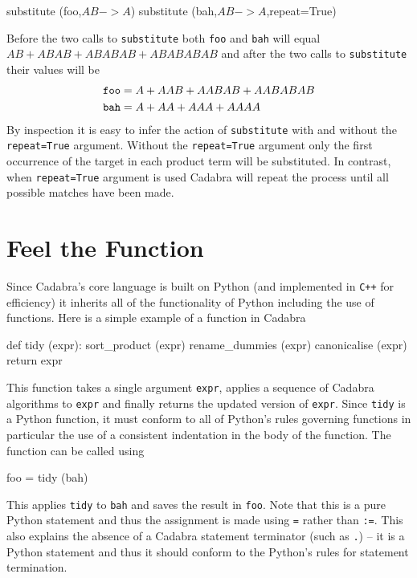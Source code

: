 \documentclass[a4paper,12pt]{article}
\numberwithin{equation}{section}%
\begin{document}
\begin{Exercises}
\begin{Exercise}
\begin{cadabra}
         substitute (foo,$A B -> A$)
         substitute (bah,$A B -> A$,repeat=True)
      \end{cadabra}
      Before the two calls to \verb|substitute| both \verb|foo| and \verb|bah| will equal
      $A B + A B A B + A B A B A B + A B A B A B A B$ and after the two calls to
      \verb|substitute| their values will be
      \begin{align*}
         {\tt foo} &= A + A A B + A A B A B + A A B A B A B\\
         {\tt bah} &= A + A A + A A A + A A A A
      \end{align*}
      By inspection it is easy to infer the action of \verb|substitute| with and without the
      \verb|repeat=True| argument. Without the \verb|repeat=True| argument only the first
      occurrence of the target in each product term will be substituted. In contrast, when
      \verb|repeat=True| argument is used Cadabra will repeat the process until all possible
      matches have been made.
   \end{Exercise}

\end{Exercises}

\clearpage

\section{Feel the Function}
\label{sec:ex-04}
\setcounter{ExerciseNum}{0}



Since Cadabra's core language is built on Python (and implemented in \verb|C++| for
efficiency) it inherits all of the functionality of Python including the use of functions.
Here is a simple example of a function in Cadabra
\begin{cadabra}
   def tidy (expr):
      sort_product   (expr)
      rename_dummies (expr)
      canonicalise   (expr)
      return expr
\end{cadabra}
This function takes a single argument \verb|expr|, applies a sequence of Cadabra algorithms
to \verb|expr| and finally returns the updated version of \verb|expr|. Since \verb|tidy| is
a Python function, it must conform to all of Python's rules governing functions in
particular the use of a consistent indentation in the body of the function. The function can
be called using
\begin{cadabra}[numbers=none]
   foo = tidy (bah)
\end{cadabra}
This applies \verb|tidy| to \verb|bah| and saves the result in \verb|foo|. Note that this is
a pure Python statement and thus the assignment is made using \verb|=| rather than
\verb|:=|. This also explains the absence of a Cadabra statement terminator (such as
\verb|.|) -- it is a Python statement and thus it should conform to the Python's rules for
statement termination.
\end{document}
